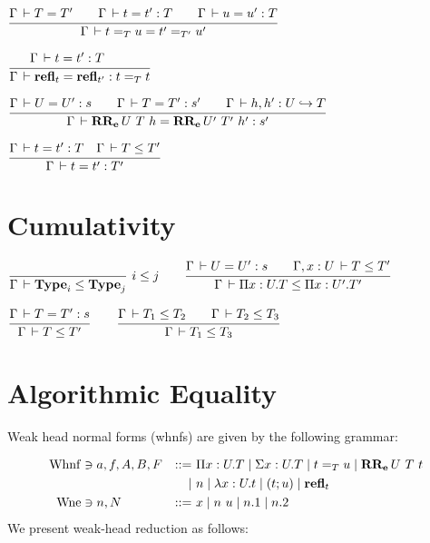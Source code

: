 \documentclass[a4paper,english]{lipics-utf8x}
\begin{document}
\begin{center}
\(
  \ru{\Gamma \der T = T' \qquad
      \Gamma \der t = t' : T \qquad
      \Gamma \der u = u' : T
    }{\Gamma \der t =_T u = t' =_{T'} u'}
\)
\end{center}

\begin{center}
\(
  \ru{\Gamma \der t = t' : T \qquad
    }{\Gamma \der \refl_t = \refl_{t'} : t =_T t}
\)
\end{center}

\begin{center}
\(
  \ru{\Gamma \der U = U' : s \qquad
      \Gamma \der T = T' : s' \qquad
      \Gamma \der h, h' : \emb{U}{T}
    }{\Gamma \der \RRe{U}{T}{h} = \RRe{U'}{T'}{h'} : s'}
\)
\end{center}


\begin{center}
\(
  \ru{\Gamma \der t = t' : T \quad
      \Gamma \der T \le T'
    }{\Gamma \der t = t' : T'}
\)
\end{center}


\section{Cumulativity}

\begin{center}
\(
  \rux{}{\Gamma \der \Type_i \le \Type_j}{i \le j}
  \qquad
  \ru{\Gamma \der U = U' : s \qquad
      \Gamma, x:U \der T \le T'
    }{\Gamma \der \Pi x:U.T \le \Pi x:U'.T'}
\)
\end{center}

\begin{center}
\(
  \ru{\Gamma \der T = T' : s
    }{\Gamma \der T \le T'}
  \qquad
  \ru{\Gamma \der T_1 \le T_2 \qquad
      \Gamma \der T_2 \le T_3
    }{\Gamma \der T_1 \le T_3}
\)
\end{center}

\section{Algorithmic Equality}


Weak head normal forms (whnfs) are given by the following grammar:

\begin{align*}
  \operatorname{Whnf} &\ni a,f,A,B,F &::=~& \Pi x:U.T \mid \Sigma x:U.T \mid t =_T u
                         \mid \operatorname{\mathbf{RR_e}}U\ T\ t \\
      &&\mid~& n \mid \lambda x:U.t \mid (t;u) \mid \operatorname{\mathbf{refl}}_t \\
  \operatorname{Wne}  &\ni n,N &::=~& x \mid n~u \mid n.1 \mid n.2
\end{align*}
%
We present weak-head reduction as follows:
\end{document}
